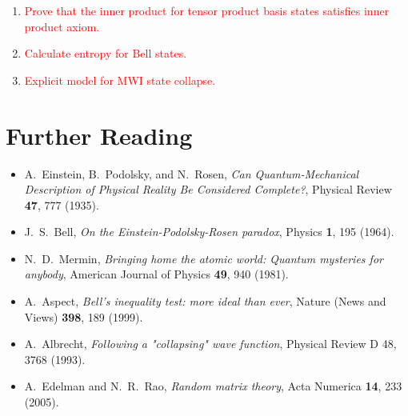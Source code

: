 \documentclass[pra,12pt]{revtex4}
\begin{document}
\begin{enumerate}
\item \textcolor{red}{Prove that the inner product for tensor product basis states satisfies inner product axiom.}
\item \textcolor{red}{Calculate entropy for Bell states.}
\item \textcolor{red}{Explicit model for MWI state collapse.}
\end{enumerate}

\section*{Further Reading}

\begin{itemize}
\item A.~Einstein, B.~Podolsky, and N.~Rosen,
  \textit{Can Quantum-Mechanical Description of Physical Reality Be
    Considered Complete?}, Physical Review \textbf{47}, 777 (1935).
  \label{cite:epr}

\item J.~S.~Bell, \textit{On the Einstein-Podolsky-Rosen paradox},
  Physics \textbf{1}, 195 (1964). \label{cite:bell}
  
\item N.~D.~Mermin, \textit{Bringing home the atomic world: Quantum
  mysteries for anybody}, American Journal of Physics \textbf{49}, 940
  (1981). \label{cite:mermin}

\item A.~Aspect, \textit{Bell's inequality test: more ideal than ever},
  Nature (News and Views) \textbf{398}, 189 (1999). \label{cite:aspect}

\item A.~Albrecht, \textit{Following a "collapsing" wave function},
  Physical Review D \textrm{48}, 3768 (1993).
\label{cite:albrecht}

\item A.~Edelman and N.~R.~Rao, \textit{Random matrix theory}, Acta
  Numerica \textbf{14}, 233 (2005).
\label{cite:edelman}
\end{itemize}
\end{document}
